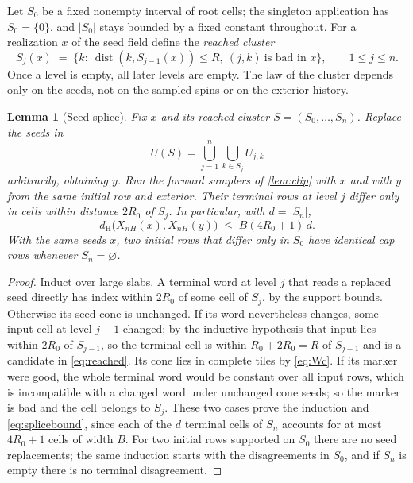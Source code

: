 \documentclass[11pt]{article}
\theoremstyle{plain}
\newtheorem{lemma}[theorem]{Lemma}
\theoremstyle{definition}
\theoremstyle{remark}
\newcommand{\dH}{d_{\mathrm{H}}}
\newcommand{\dist}{\operatorname{dist}}
\begin{document}
Let $S_0$ be a fixed nonempty interval of root cells; the singleton application has $S_0=\{0\}$, and $|S_0|$ stays bounded by a fixed constant throughout. For a realization $x$ of the seed field define the \emph{reached cluster}
\begin{equation}
S_j(x)\;=\;\bigl\{k:\ \dist(k,S_{j-1}(x))\le R,\ (j,k)\ \text{is bad in }x\bigr\},\qquad 1\le j\le n.
\label{eq:reached}
\end{equation}
Once a level is empty, all later levels are empty. The law of the cluster depends only on the seeds, not on the sampled spins or on the exterior history.

\begin{lemma}[Seed splice]
\label{lem:splice}
Fix $x$ and its reached cluster $S=(S_0,\dots,S_n)$. Replace the seeds in
\[
U(S)=\bigcup_{j=1}^n\bigcup_{k\in S_j}U_{j,k}
\]
arbitrarily, obtaining $y$. Run the forward samplers of \cref{lem:clip} with $x$ and with $y$ from the same initial row and exterior. Their terminal rows at level $j$ differ only in cells within distance $2R_0$ of $S_j$. In particular, with $d=|S_n|$,
\begin{equation}
\dH\bigl(X_{nH}(x),X_{nH}(y)\bigr)\;\le\;B(4R_0+1)\,d.
\label{eq:splicebound}
\end{equation}
With the same seeds $x$, two initial rows that differ only in $S_0$ have identical cap rows whenever $S_n=\varnothing$.
\end{lemma}

\begin{proof}
Induct over large slabs. A terminal word at level $j$ that reads a replaced seed directly has index within $2R_0$ of some cell of $S_j$, by the support bounds. Otherwise its seed cone is unchanged. If its word nevertheless changes, some input cell at level $j-1$ changed; by the inductive hypothesis that input lies within $2R_0$ of $S_{j-1}$, so the terminal cell is within $R_0+2R_0=R$ of $S_{j-1}$ and is a candidate in \eqref{eq:reached}. Its cone lies in complete tiles by \eqref{eq:Wc}. If its marker were good, the whole terminal word would be constant over all input rows, which is incompatible with a changed word under unchanged cone seeds; so the marker is bad and the cell belongs to $S_j$. These two cases prove the induction and \eqref{eq:splicebound}, since each of the $d$ terminal cells of $S_n$ accounts for at most $4R_0+1$ cells of width $B$. For two initial rows supported on $S_0$ there are no seed replacements; the same induction starts with the disagreements in $S_0$, and if $S_n$ is empty there is no terminal disagreement.
\end{proof}
\end{document}
